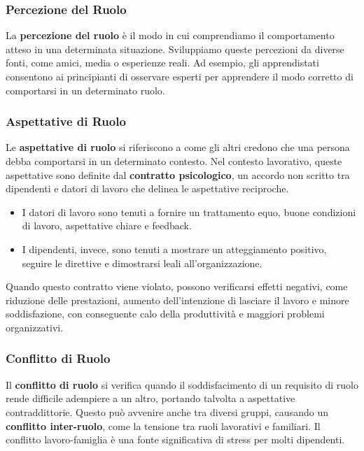 \documentclass{article}
\begin{document}
\subsubsection{Percezione del Ruolo}

La \textbf{percezione del ruolo} è il modo in cui comprendiamo il comportamento atteso in una determinata situazione. Sviluppiamo queste percezioni da diverse fonti, come amici, media o esperienze reali. Ad esempio, gli apprendistati consentono ai principianti di osservare esperti per apprendere il modo corretto di comportarsi in un determinato ruolo.

\subsubsection{Aspettative di Ruolo}

Le \textbf{aspettative di ruolo} si riferiscono a come gli altri credono che una persona debba comportarsi in un determinato contesto. Nel contesto lavorativo, queste aspettative sono definite dal \textbf{contratto psicologico}, un accordo non scritto tra dipendenti e datori di lavoro che delinea le aspettative reciproche. 

\begin{itemize}
    \item I datori di lavoro sono tenuti a fornire un trattamento equo, buone condizioni di lavoro, aspettative chiare e feedback.
    \item I dipendenti, invece, sono tenuti a mostrare un atteggiamento positivo, seguire le direttive e dimostrarsi leali all'organizzazione.
\end{itemize}

Quando questo contratto viene violato, possono verificarsi effetti negativi, come riduzione delle prestazioni, aumento dell'intenzione di lasciare il lavoro e minore soddisfazione, con conseguente calo della produttività e maggiori problemi organizzativi.

\subsubsection{Conflitto di Ruolo}

Il \textbf{conflitto di ruolo} si verifica quando il soddisfacimento di un requisito di ruolo rende difficile adempiere a un altro, portando talvolta a aspettative contraddittorie. Questo può avvenire anche tra diversi gruppi, causando un \textbf{conflitto inter-ruolo}, come la tensione tra ruoli lavorativi e familiari. Il conflitto lavoro-famiglia è una fonte significativa di stress per molti dipendenti.
\end{document}

